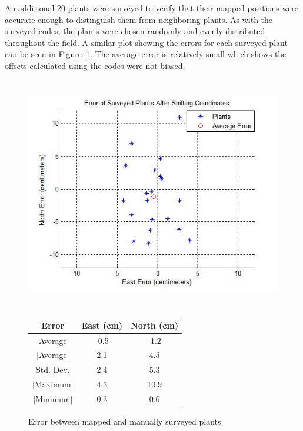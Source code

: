 An additional 20 plants were surveyed to verify that their mapped positions were accurate enough to distinguish them from neighboring plants.  As with the surveyed codes, the plants were chosen randomly and evenly distributed throughout the field.   A similar plot showing the errors for each surveyed plant can be seen in Figure~\ref{figure:plant_errors}.  The average error is relatively small which shows the offsets calculated using the codes were not biased.   

  \begin{figure}
	\centering
    \includegraphics[height=4in]{figures/plant_errors.jpg}
    \newline
    \newline
    \centering
    \begin{tabular}[c]{|c|c|c|}
        \hline
        Error & East (cm) & North (cm) \\ 
        \hline
        Average   & -0.5 & -1.2           \\
        $|$Average$|$ & 2.1 & 4.5       \\
        Std. Dev. & 2.4 & 5.3       \\
        $|$Maximum$|$   & 4.3 & 10.9       \\
        $|$Minimum$|$   & 0.3 & 0.6       \\
        \hline
    \end{tabular}
    \captionsetup{labelformat=andtable}
    \caption[Errors in surveyed plants]{Error between mapped and manually surveyed plants.}
    \label{figure:plant_errors}
  \end{figure}

